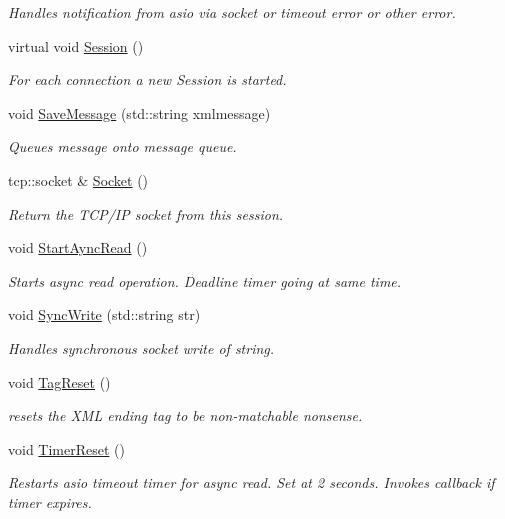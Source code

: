 \begin{DoxyCompactItemize}
\begin{DoxyCompactList}\small\item\em Handles notification from asio via socket or timeout error or other error. \end{DoxyCompactList}\item 
virtual void \hyperlink{classCAsioCrclSession_a82d6057c71a6a0c6c8bc4e01dbf6b005}{Session} ()
\begin{DoxyCompactList}\small\item\em For each connection a new Session is started. \end{DoxyCompactList}\item 
void \hyperlink{classCAsioCrclSession_a5b1256e812de4571c1515f22dcadc393}{Save\-Message} (std\-::string xmlmessage)
\begin{DoxyCompactList}\small\item\em Queues message onto message queue. \end{DoxyCompactList}\item 
tcp\-::socket \& \hyperlink{classCAsioCrclSession_a9928b65de937da275b9ce9c5d7c2a87c}{Socket} ()
\begin{DoxyCompactList}\small\item\em Return the T\-C\-P/\-I\-P socket from this session. \end{DoxyCompactList}\item 
void \hyperlink{classCAsioCrclSession_ac7e0900916ab6de40bf546116d5e6d3e}{Start\-Aync\-Read} ()
\begin{DoxyCompactList}\small\item\em Starts async read operation. Deadline timer going at same time. \end{DoxyCompactList}\item 
void \hyperlink{classCAsioCrclSession_a4bc26f68ac76ecf130e1d2ef2354313d}{Sync\-Write} (std\-::string str)
\begin{DoxyCompactList}\small\item\em Handles synchronous socket write of string. \end{DoxyCompactList}\item 
void \hyperlink{classCAsioCrclSession_a1addeca47fee4f922b9a5420fe6adae3}{Tag\-Reset} ()
\begin{DoxyCompactList}\small\item\em resets the X\-M\-L ending tag to be non-\/matchable nonsense. \end{DoxyCompactList}\item 
void \hyperlink{classCAsioCrclSession_ae2c3046d0261ab2622a3c074f1754e58}{Timer\-Reset} ()
\begin{DoxyCompactList}\small\item\em Restarts asio timeout timer for async read. Set at 2 seconds. Invokes callback if timer expires. \end{DoxyCompactList}\end{DoxyCompactItemize}
